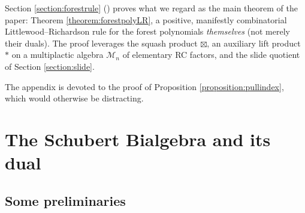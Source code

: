 \documentclass{amsart}
\theoremstyle{definition}
\theoremstyle{remark}
\numberwithin{equation}{subsection}
\begin{document}
Section \ref{section:forestrule} () proves what we regard as the main theorem of the paper: Theorem \ref{theorem:forestpolyLR}, a positive, manifestly combinatorial Littlewood--Richardson rule for the forest polynomials \emph{themselves} (not merely their duals). The proof leverages the squash product $\boxtimes$, an auxiliary lift product $*$ on a multiplactic algebra $\mathcal{M}_n$ of elementary RC factors, and the slide quotient of Section \ref{section:slide}.

The appendix is devoted to the proof of Proposition \ref{proposition:pullindex}, which would otherwise be distracting.

\clearpage

\section{The Schubert Bialgebra and its dual}\label{section:bialgebra}
\subsection{Some preliminaries}
\end{document}
